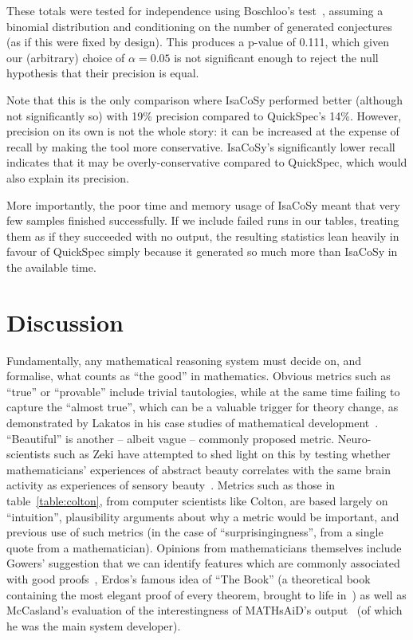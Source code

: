 These totals were tested for independence using Boschloo's
test~\cite{lydersen2009recommended}, assuming a binomial distribution and
conditioning on the number of generated conjectures (as if this were fixed by
design). This produces a p-value of 0.111, which given our (arbitrary) choice of
$\alpha = 0.05$ is not significant enough to reject the null hypothesis that
their precision is equal.

Note that this is the only comparison where IsaCoSy performed better (although
not significantly so) with 19\% precision compared to QuickSpec's 14\%. However,
precision on its own is not the whole story: it can be increased at the expense
of recall by making the tool more conservative. IsaCoSy's significantly lower
recall indicates that it may be overly-conservative compared to QuickSpec, which
would also explain its precision.

More importantly, the poor time and memory usage of IsaCoSy meant that very few
samples finished successfully. If we include failed runs in our tables, treating
them as if they succeeded with no output, the resulting statistics lean heavily
in favour of QuickSpec simply because it generated so much more than IsaCoSy in
the available time.


\section{Discussion}
\label{sec:discussion}

Fundamentally, any mathematical reasoning system must decide on, and formalise,
what counts as ``the good'' in mathematics.  Obvious metrics such as ``true'' or
``provable'' include trivial tautologies, while at the same time failing to
capture the ``almost true'', which can be a valuable trigger for theory change,
as demonstrated by Lakatos in his case studies of mathematical
development~\cite{lakatos}. ``Beautiful'' is another -- albeit vague -- commonly
proposed metric. Neuro-scientists such as Zeki \etal{} have attempted to shed
light on this by testing whether mathematicians' experiences of abstract beauty
correlates with the same brain activity as experiences of sensory
beauty~\cite{10.3389/fnhum.2014.00068}. Metrics such as those in
table~\ref{table:colton}, from computer scientists like Colton, are based
largely on ``intuition'', plausibility arguments about why a metric would be
important, and previous use of such metrics (in the case of
``surprisingingness'', from a single quote from a mathematician).
Opinions from mathematicians themselves include Gowers' suggestion that we can
identify features which are commonly associated with good
proofs~\cite{gowers2000two}, Erdos's famous idea of ``The Book'' (a theoretical
book containing the most elegant proof of every theorem, brought to life
in~\cite{aigner2010proofs}) as well as McCasland's evaluation of the
interestingness of MATHsAiD's output~\cite{roy} (of which he was the main system
developer).


